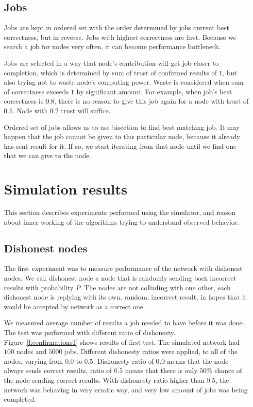 \subsection{Jobs}

Jobs are kept in ordered set with the order determined by jobs current best correctness, but in reverse. Jobs with highest correctness are first. Because we search a job for nodes very often, it can become performance bottleneck. 

Jobs are selected in a way that node's contribution will get job closer to completion, which is determined by sum of trust of confirmed results of $1$, but also trying not to waste node's computing power. Waste is considered when sum of correctness exceeds $1$ by significant amount. For example, when job's best correctness is $0.8$, there is no reason to give this job again for a node with trust of $0.5$. Node with $0.2$ trust will suffice.

Ordered set of jobs allows us to use bisection to find best matching job. It may happen that the job cannot be given to this particular node, because it already has sent result for it. If so, we start iterating from that node until we find one that we can give to the node.

\section{Simulation results}

This section describes experiments performed using the simulator, and reason about inner working of the algorithms trying to understand observed behavior. 

\subsection{Dishonest nodes}

The first experiment was to measure performance of the network with dishonest nodes. We call dishonest node a node that is randomly sending back incorrect results with probability $P$. The nodes are not colluding with one other, each dishonest node is replying with its own, random, incorrect result, in hopes that it would be accepted by network as a correct one.

We measured average number of results a job needed to have before it was done. The test was performed with different ratio of dishonesty. Figure~\ref{f:confirmations1} shows results of first test. The simulated network had $100$ nodes and $5000$ jobs. Different dishonesty ratios were applied, to all of the nodes, varying from $0.0$ to $0.5$. Dishonesty ratio of $0.0$ means that the node always sends correct results, ratio of $0.5$ means that there is only $50\%$ chance of the node sending correct results. With dishonesty ratio higher than $0.5$, the network was behaving in very erratic way, and very low amount of jobs was being completed.

